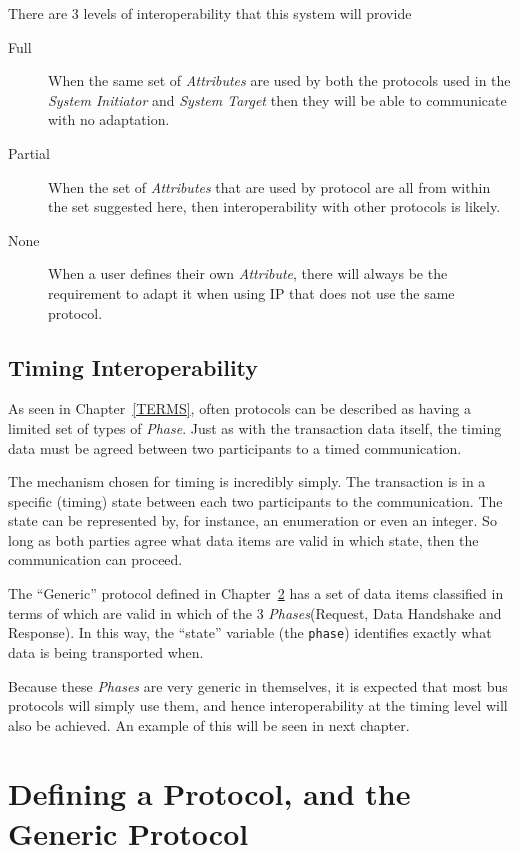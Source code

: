 \documentclass[12pt,oneside]{gsbook}
\newcommand{\master}{{\em System Initiator}\xspace}
\newcommand{\slave}{{\em System Target}\xspace}
\newcommand{\atom}{{\em Phase}\xspace}
\newcommand{\atoms}{{\em Phases}\xspace}
\newcommand{\quark}{{\em Attribute}\xspace}
\newcommand{\quarks}{{\em Attributes}\xspace}
\begin{document}
There are 3 levels of interoperability that this system will provide

\begin{description}
\item [Full] When the same set of \quarks are used by both the protocols used in
the \master and \slave then they will be able to communicate with no adaptation.
\item [Partial] When the set of \quarks that are used by protocol are all from
within the set suggested here, then interoperability with other protocols is
likely.
\item [None] When a user defines their own \quark, there will always be the
requirement to adapt it when using IP that does not use the same protocol.
\end{description}


\section{Timing Interoperability}

As seen in Chapter~\ref{TERMS}, often protocols can be described as having a limited set of types of \atom. Just as
with the transaction data itself, the timing data must be agreed between two participants to a timed
communication. 

The mechanism chosen for timing is incredibly simply. The transaction is in a specific (timing)
state between each two participants to the communication. The state can be represented by, for
instance, an enumeration or even an integer. So long as both parties agree what data items are valid
in which state, then the communication can proceed.

The ``Generic'' protocol defined in Chapter~\ref{PROTOCOL}  has a set of data items classified in terms of which are
valid in which of the 3 \atoms (Request, Data Handshake and Response). In this way, the ``state''
variable (the {\tt phase}) identifies exactly what data is being transported when.

Because these \atoms are very generic in themselves, it is expected that most bus protocols will
simply use them, and hence interoperability at the timing level will also be achieved.
An example of this will be seen in next chapter.

\chapter{Defining a Protocol, and the Generic Protocol}
\label{PROTOCOL}
\end{document}
